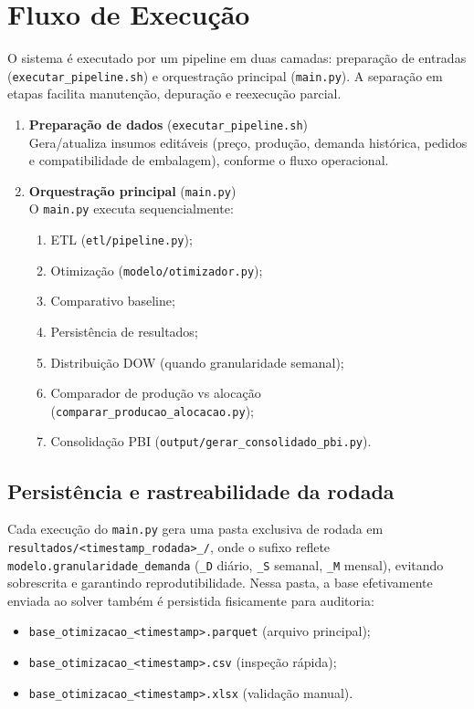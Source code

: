 \documentclass[11pt,a4paper]{article}
\begin{document}
\section{Fluxo de Execução}

O sistema é executado por um pipeline em duas camadas: preparação de entradas
(\texttt{executar\_pipeline.sh}) e orquestração principal (\texttt{main.py}).
A separação em etapas facilita manutenção, depuração e reexecução parcial.

\begin{enumerate}
    \item \textbf{Preparação de dados} (\texttt{executar\_pipeline.sh})\\
    Gera/atualiza insumos editáveis (preço, produção, demanda histórica,
    pedidos e compatibilidade de embalagem), conforme o fluxo operacional.

    \item \textbf{Orquestração principal} (\texttt{main.py})\\
    O \texttt{main.py} executa sequencialmente:
    \begin{enumerate}[label=\alph*.]
        \item ETL (\texttt{etl/pipeline.py});
        \item Otimização (\texttt{modelo/otimizador.py});
        \item Comparativo baseline;
        \item Persistência de resultados;
        \item Distribuição DOW (quando granularidade semanal);
        \item Comparador de produção vs alocação (\texttt{comparar\_producao\_alocacao.py});
        \item Consolidação PBI (\texttt{output/gerar\_consolidado\_pbi.py}).
    \end{enumerate}
\end{enumerate}

\subsection{Persistência e rastreabilidade da rodada}

Cada execução do \texttt{main.py} gera uma pasta exclusiva de rodada em
\texttt{resultados/<timestamp\_rodada>\_<D|S|M>/}, onde o sufixo reflete
\texttt{modelo.granularidade\_demanda} (\texttt{\_D} diário, \texttt{\_S}
semanal, \texttt{\_M} mensal), evitando sobrescrita e garantindo
reprodutibilidade. Nessa pasta, a base efetivamente enviada ao solver também é
persistida fisicamente para auditoria:
\begin{itemize}
    \item \texttt{base\_otimizacao\_<timestamp>.parquet} (arquivo principal);
    \item \texttt{base\_otimizacao\_<timestamp>.csv} (inspeção rápida);
    \item \texttt{base\_otimizacao\_<timestamp>.xlsx} (validação manual).
\end{itemize}
\end{document}
